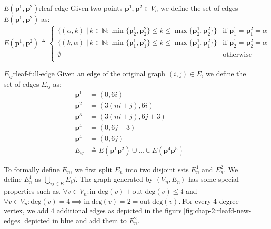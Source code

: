 \begin{definitionbox}{$E(\mathbf{p}^1,\mathbf{p}^2 )$}{rleaf-edge}
    \label{def:rleaf-edge}
    Given two points $\mathbf{p}^1, \mathbf{p}^2 \in V_n$ we define the set of edges
    $E(\mathbf{p}^1, \mathbf{p}^2)$ as:
    $$
        E(\mathbf{p}^1, \mathbf{p}^2) \triangleq \begin{cases}
            \{(\alpha, k) \mid k \in \mathbb{N} : \min\{\mathbf{p}^1_2, \mathbf{p}^2_2\} \leq k  \leq \max\{\mathbf{p}^1_2, \mathbf{p}^2_2\}\} & \text{if }\mathbf{p}^1_1 = \mathbf{p}^2_1 = \alpha \\
            \{(k, \alpha) \mid k \in \mathbb{N} : \min\{\mathbf{p}^1_1, \mathbf{p}^2_1\} \leq k  \leq \max\{\mathbf{p}^1_1, \mathbf{p}^2_1\}\} & \text{if }\mathbf{p}^1_2 = \mathbf{p}^2_2 = \alpha \\
            \emptyset                                                                                                                          & \text{otherwise}                                   \\
        \end{cases}
    $$
\end{definitionbox}

\begin{definitionbox}{$E_{ij}$}{rleaf-full-edge}
    \label{def:rleaf-full-edge}
    Given an edge of the original graph $(i,j) \in E$, we define the set of edges $E_{ij}$ as:
    \begin{align*}
        \mathbf{p}^1 & = (0, 6i)                                                                           \\
        \mathbf{p}^2 & = (3(ni + j), 6i)                                                                   \\
        \mathbf{p}^3 & = (3(ni + j), 6j + 3)                                                               \\
        \mathbf{p}^4 & = (0, 6j + 3)                                                                       \\
        \mathbf{p}^4 & = (0, 6j)                                                                           \\
        E_{ij}       & \triangleq E(\mathbf{p}^1\mathbf{p}^2) \cup \dots  \cup E(\mathbf{p}^4\mathbf{p}^5)
    \end{align*}
\end{definitionbox}

To formally define $E_n$, we first split $E_n$ into two disjoint sets $E^1_n$ and $E^2_n$.
We define $E^1_n$ as  $\bigcup_{ij \in E} E_ij$. The graph generated by
$(V_n, E_n)$ has some special properties such as, $\forall v \in V_n: \text{in-deg}(v) + \text{out-deg}(v) \leq 4$
and $\forall v \in V_n: \text{deg}(v) = 4 \implies \text{in-deg}(v) =2 = \text{out-deg}(v)$. For every
4-degree vertex, we add $4$ additional edges as depicted in the figure \ref{fig:chap-2:rleafd-new-edges}
depicted in blue and add them to $E^2_n$.

